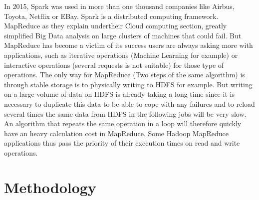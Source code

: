 \documentclass{acmtog} %
\begin{document}
In 2015, Spark was used in more than one thousand companies like Airbus, Toyota, Netflix or EBay. Spark is a distributed computing framework. MapReduce \cite{Baltas17} as they explain undertheir Cloud computing section, greatly simplified Big Data \cite{Garg14} analysis on large clusters of machines that could fail. But MapReduce has become a victim of its success users are always asking more with applications, such as iterative operations (Machine Learning for example) or interactive operations (several requests is not suitable) for those type of operations. The only way for MapReduce (Two steps of the same algorithm) is through stable storage is to physically writing to HDFS for example. But writing on a large volume of data on HDFS is already taking a long time since it is necessary to duplicate this data to be able to cope with any failures and to reload several times the same data from HDFS in the following jobs will be very slow. An algorithm that repeats the same operation in a loop will therefore quickly have an heavy calculation cost in MapReduce. Some Hadoop MapReduce applications thus pass the priority of their execution times on read and write operations.



\section{Methodology}
\label{sec:methodology}
\end{document}

